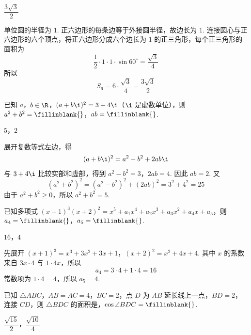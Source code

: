 \begin{answer}
\(\dfrac{3\sqrt{3}}{2}\)
\end{answer}

\begin{solution}
单位圆的半径为 \(1\). 正六边形的每条边等于外接圆半径，故边长为 \(1\). 连接圆心与正六边形的六个顶点，将正六边形分成六个边长为 \(1\) 的正三角形，每个正三角形的面积为
\[
\frac12\cdot1\cdot1\cdot\sin60^\circ=\frac{\sqrt3}{4}
\]
所以
\[
S_6=6\cdot\frac{\sqrt3}{4}=\frac{3\sqrt3}{2}
\]
\end{solution}

\begin{problem}
已知 \(a\)，\(b\in\R\)，\((a+b\i)^2=3+4\i\)（\(\i\) 是虚数单位），则 \(a^2+b^2=\fillinblank{}\)，\(ab=\fillinblank{}\).
\end{problem}

\begin{answer}
\(5\)，\(2\)
\end{answer}

\begin{solution}
展开复数等式左边，得
\[
(a+b\i)^2=a^2-b^2+2ab\i
\]
与 \(3+4\i\) 比较实部和虚部，得到
\(a^2-b^2=3\)，\(2ab=4\).
因此 \(ab=2\). 又
\[
(a^2+b^2)^2=(a^2-b^2)^2+(2ab)^2=3^2+4^2=25
\]
由于 \(a^2+b^2\geq0\)，所以 \(a^2+b^2=5\).
\end{solution}

\begin{problem}
已知多项式 \((x+1)^3(x+2)^2=x^5+a_1x^4+a_2x^3+a_3x^2+a_4x+a_5\)，则 \(a_4=\fillinblank{}\)，\(a_5=\fillinblank{}\).
\end{problem}

\begin{answer}
\(16\)，\(4\)
\end{answer}

\begin{solution}
先展开
\((x+1)^3=x^3+3x^2+3x+1\)，\((x+2)^2=x^2+4x+4\).
其中 \(x\) 的系数来自 \(3x\cdot4\) 与 \(1\cdot4x\)，所以
\[
a_4=3\cdot4+1\cdot4=16
\]
常数项为 \(1\cdot4=4\)，所以 \(a_5=4\).
\end{solution}

\begin{problem}
已知 \(\triangle ABC\)，\(AB=AC=4\)，\(BC=2\)，点 \(D\) 为 \(AB\) 延长线上一点，\(BD=2\)，连接 \(CD\)，则 \(\triangle BDC\) 的面积是\fillinblank{}，\(\cos\angle BDC=\fillinblank{}\).
\end{problem}

\begin{answer}
\(\dfrac{\sqrt{15}}{2}\)，\(\dfrac{\sqrt{10}}{4}\)
\end{answer}

